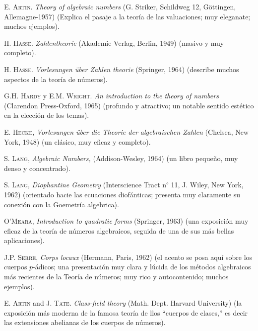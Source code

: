 \documentclass[10pt,oneside,bibtotoc,smallheadings,leqno,a5paper,DIV=12]{scrbook}
\numberwithin{equation}{section}
\theoremstyle{defi}
\theoremstyle{enonce}
\theoremstyle{rem}
\numberwithin{theorem}{section}
\numberwithin{proposition}{section}
\numberwithin{definition}{section}
\numberwithin{lemma}{section}
\numberwithin{corollary}{section}
\numberwithin{example}{section}
\numberwithin{footnote}{section}%
\begin{document}
\backmatter

\begin{thebibliography}{21}

\bibitem{} {\scshape E. Artin.} {\itshape Theory of algebraic numbers}
(G. Striker, Schildweg 12, G\"ottingen, Allemagne-1957)
(Explica el pasaje a la teor\'ia de las valuaciones; muy
eleganate; muchos ejemplos).

\bibitem{} {\scshape H. Hasse.} {\itshape Zahlentheorie}
(Akademie Verlag, Berlin, 1949) (masivo y muy completo).

\bibitem{} {\scshape H. Hasse.} {\itshape Vorlesungen \"uber
Zahlen theorie} (Springer, 1964) (describe muchos aspectos
de la teor\'ia de n\'umeros).

\bibitem{} {\scshape G.H. Hardy} y {\scshape E.M. Wright.} {\itshape An introduction to the theory
of numbers} (Clarendon Press-Oxford, 1965) (profundo y atractivo; un notable sentido est\'etico en
la elecci\'on de los temas).

\bibitem{} {\scshape E. Hecke,} {\itshape Vorlesungen \"uber die Theorie der algebraischen Zahlen}
(Chelsea, New York, 1948) (un cl\'asico, muy eficaz y completo).

\bibitem{} {\scshape S. Lang,} {\itshape Algebraic Numbers,} (Addison-Wesley, 1964) (un
libro peque\~no, muy denso y concentrado).

\bibitem{} {\scshape S. Lang,} {\itshape Diophantine Geometry} (Interscience Tract n\textsuperscript{$\circ$}
11, J. Wiley, New York, 1962) (orientado hacie las ecuaciones diof\'anticas; presenta muy claramente su
conexi\'on con la Goemetr\'ia algebrica).

\bibitem{} {\scshape O'Meara,} {\itshape Introduction to quadratic forms} (Springer, 1963) (una exposici\'on
muy eficaz de la teor\'ia de n\'umeros algebraicos, seguida de una de sus m\'as bellas aplicaciones).

\bibitem{} {\scshape J.P. Serre,} {\itshape Corps locaux} (Hermann, Paris, 1962) (el acento se posa aqu\'i
sobre los cuerpos $p$-\'adicos; una presentaci\'on muy clara y l\'ucida de los m\'etodos algebraicos m\'as
recientes de la Teor\'ia de n\'umeros; muy rico y autocontenido; muchos ejemplos).

\bibitem{} {\scshape E. Artin} and {\scshape J. Tate.} {\itshape Class-field theory}
(Math. Dept. Harvard University) (la exposici\'on m\'as moderna de la famosa teor\'ia de llos ``cuerpos de clases,''
es decir las extensiones abelianas de los cuerpos de n\'umeros).


\end{thebibliography}
\end{document}
